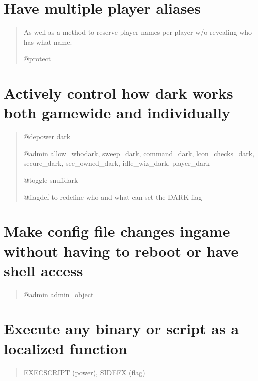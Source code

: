 \documentclass[letterpaper,10pt,english]{sphinxmanual}
\begin{document}
\section{Have multiple player aliases}
\label{\detokenize{features:have-multiple-player-aliases}}\begin{quote}

\sphinxAtStartPar
As well as a method to reserve player names per player w/o revealing who has what name.

\sphinxAtStartPar
@protect
\end{quote}


\section{Actively control how dark works both game\sphinxhyphen{}wide and individually}
\label{\detokenize{features:actively-control-how-dark-works-both-game-wide-and-individually}}\begin{quote}

\sphinxAtStartPar
@depower dark

\sphinxAtStartPar
@admin allow\_whodark, sweep\_dark, command\_dark, lcon\_checks\_dark,
secure\_dark, see\_owned\_dark, idle\_wiz\_dark, player\_dark

\sphinxAtStartPar
@toggle snuffdark

\sphinxAtStartPar
@flagdef to redefine who and what can set the DARK flag
\end{quote}


\section{Make config file changes in\sphinxhyphen{}game without having to reboot or have shell access}
\label{\detokenize{features:make-config-file-changes-in-game-without-having-to-reboot-or-have-shell-access}}\begin{quote}

\sphinxAtStartPar
@admin admin\_object
\end{quote}


\section{Execute any binary or script as a localized function}
\label{\detokenize{features:execute-any-binary-or-script-as-a-localized-function}}\begin{quote}

\sphinxAtStartPar
EXECSCRIPT (power), SIDEFX (flag)
\end{quote}
\end{document}
